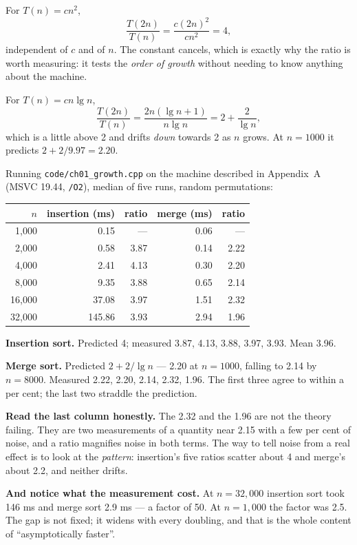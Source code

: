 \begin{conceptbox}
For $T(n) = cn^{2}$,
\[ \frac{T(2n)}{T(n)} = \frac{c(2n)^{2}}{cn^{2}} = 4, \]
independent of $c$ and of $n$. The constant cancels, which is exactly why the
ratio is worth measuring: it tests the \emph{order of growth} without needing
to know anything about the machine.

\smallskip
For $T(n) = cn\lg n$,
\[ \frac{T(2n)}{T(n)} = \frac{2n(\lg n + 1)}{n \lg n} = 2 + \frac{2}{\lg n}, \]
which is a little above 2 and drifts \emph{down} towards 2 as $n$ grows. At
$n = 1000$ it predicts $2 + 2/9.97 = 2.20$.
\end{conceptbox}

\begin{worked}
Running \texttt{code/ch01\_growth.cpp} on the machine described in Appendix~A
(MSVC 19.44, \texttt{/O2}), median of five runs, random permutations:

\begin{center}
\begin{tabular}{@{}rrrrr@{}}
\toprule
\rowcolor{primary!15}
$n$ & insertion (ms) & ratio & merge (ms) & ratio \\
\midrule
1{,}000  &   0.15 & ---  & 0.06 & ---  \\
2{,}000  &   0.58 & 3.87 & 0.14 & 2.22 \\
4{,}000  &   2.41 & 4.13 & 0.30 & 2.20 \\
8{,}000  &   9.35 & 3.88 & 0.65 & 2.14 \\
16{,}000 &  37.08 & 3.97 & 1.51 & 2.32 \\
32{,}000 & 145.86 & 3.93 & 2.94 & 1.96 \\
\bottomrule
\end{tabular}
\end{center}

\smallskip
\textbf{Insertion sort.} Predicted 4; measured 3.87, 4.13, 3.88, 3.97, 3.93.
Mean 3.96.

\smallskip
\textbf{Merge sort.} Predicted $2 + 2/\lg n$ --- 2.20 at $n = 1000$, falling to
2.14 by $n = 8000$. Measured 2.22, 2.20, 2.14, 2.32, 1.96. The first three
agree to within a per cent; the last two straddle the prediction.

\smallskip
\textbf{Read the last column honestly.} The 2.32 and the 1.96 are not the
theory failing. They are two measurements of a quantity near 2.15 with a few
per cent of noise, and a ratio magnifies noise in both terms. The way to tell
noise from a real effect is to look at the \emph{pattern}: insertion's five
ratios scatter about 4 and merge's about 2.2, and neither drifts.

\smallskip
\textbf{And notice what the measurement cost.} At $n = 32{,}000$ insertion
sort took 146 ms and merge sort 2.9 ms --- a factor of 50. At $n = 1{,}000$ the
factor was 2.5. The gap is not fixed; it widens with every doubling, and that
is the whole content of ``asymptotically faster''.
\end{worked}

